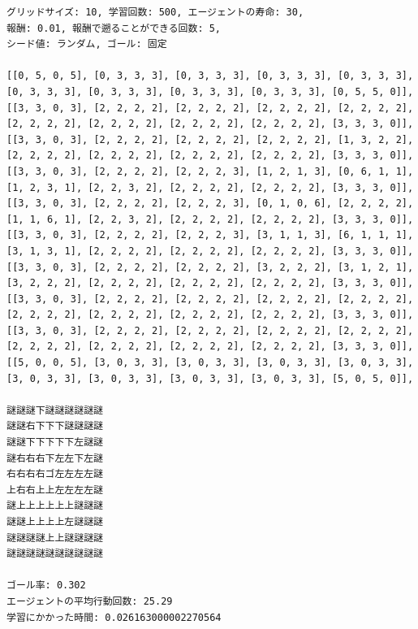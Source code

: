 \documentclass[a4j,11pt]{jarticle}
\begin{document}
\begin{verbatim}
グリッドサイズ: 10, 学習回数: 500, エージェントの寿命: 30,
報酬: 0.01, 報酬で遡ることができる回数: 5,
シード値: ランダム, ゴール: 固定

[[0, 5, 0, 5], [0, 3, 3, 3], [0, 3, 3, 3], [0, 3, 3, 3], [0, 3, 3, 3], [0, 3, 3, 3], [0, 3, 3, 3], [0, 3, 3, 3], [0, 3, 3, 3], [0, 5, 5, 0]],
[[3, 3, 0, 3], [2, 2, 2, 2], [2, 2, 2, 2], [2, 2, 2, 2], [2, 2, 2, 2], [2, 2, 2, 2], [2, 2, 2, 2], [2, 2, 2, 2], [2, 2, 2, 2], [3, 3, 3, 0]],
[[3, 3, 0, 3], [2, 2, 2, 2], [2, 2, 2, 2], [2, 2, 2, 2], [1, 3, 2, 2], [2, 2, 2, 2], [2, 2, 2, 2], [2, 2, 2, 2], [2, 2, 2, 2], [3, 3, 3, 0]],
[[3, 3, 0, 3], [2, 2, 2, 2], [2, 2, 2, 3], [1, 2, 1, 3], [0, 6, 1, 1], [1, 2, 3, 1], [2, 2, 3, 2], [2, 2, 2, 2], [2, 2, 2, 2], [3, 3, 3, 0]],
[[3, 3, 0, 3], [2, 2, 2, 2], [2, 2, 2, 3], [0, 1, 0, 6], [2, 2, 2, 2], [1, 1, 6, 1], [2, 2, 3, 2], [2, 2, 2, 2], [2, 2, 2, 2], [3, 3, 3, 0]],
[[3, 3, 0, 3], [2, 2, 2, 2], [2, 2, 2, 3], [3, 1, 1, 3], [6, 1, 1, 1], [3, 1, 3, 1], [2, 2, 2, 2], [2, 2, 2, 2], [2, 2, 2, 2], [3, 3, 3, 0]],
[[3, 3, 0, 3], [2, 2, 2, 2], [2, 2, 2, 2], [3, 2, 2, 2], [3, 1, 2, 1], [3, 2, 2, 2], [2, 2, 2, 2], [2, 2, 2, 2], [2, 2, 2, 2], [3, 3, 3, 0]],
[[3, 3, 0, 3], [2, 2, 2, 2], [2, 2, 2, 2], [2, 2, 2, 2], [2, 2, 2, 2], [2, 2, 2, 2], [2, 2, 2, 2], [2, 2, 2, 2], [2, 2, 2, 2], [3, 3, 3, 0]],
[[3, 3, 0, 3], [2, 2, 2, 2], [2, 2, 2, 2], [2, 2, 2, 2], [2, 2, 2, 2], [2, 2, 2, 2], [2, 2, 2, 2], [2, 2, 2, 2], [2, 2, 2, 2], [3, 3, 3, 0]],
[[5, 0, 0, 5], [3, 0, 3, 3], [3, 0, 3, 3], [3, 0, 3, 3], [3, 0, 3, 3], [3, 0, 3, 3], [3, 0, 3, 3], [3, 0, 3, 3], [3, 0, 3, 3], [5, 0, 5, 0]],

謎謎謎下謎謎謎謎謎謎
謎謎右下下下謎謎謎謎
謎謎下下下下下左謎謎
謎右右右下左左下左謎
右右右右ゴ左左左左謎
上右右上上左左左左謎
謎上上上上上上謎謎謎
謎謎上上上上左謎謎謎
謎謎謎謎上上謎謎謎謎
謎謎謎謎謎謎謎謎謎謎

ゴール率: 0.302
エージェントの平均行動回数: 25.29
学習にかかった時間: 0.026163000002270564
\end{verbatim}

\newpage
\end{document}
